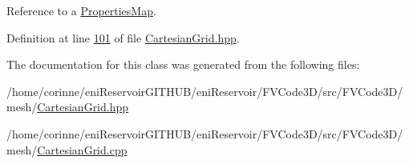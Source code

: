 Reference to a \hyperlink{classFVCode3D_1_1PropertiesMap}{Properties\+Map}. 



Definition at line \hyperlink{CartesianGrid_8hpp_source_l00101}{101} of file \hyperlink{CartesianGrid_8hpp_source}{Cartesian\+Grid.\+hpp}.



The documentation for this class was generated from the following files\+:\begin{DoxyCompactItemize}
\item 
/home/corinne/eni\+Reservoir\+G\+I\+T\+H\+U\+B/eni\+Reservoir/\+F\+V\+Code3\+D/src/\+F\+V\+Code3\+D/mesh/\hyperlink{CartesianGrid_8hpp}{Cartesian\+Grid.\+hpp}\item 
/home/corinne/eni\+Reservoir\+G\+I\+T\+H\+U\+B/eni\+Reservoir/\+F\+V\+Code3\+D/src/\+F\+V\+Code3\+D/mesh/\hyperlink{CartesianGrid_8cpp}{Cartesian\+Grid.\+cpp}\end{DoxyCompactItemize}
